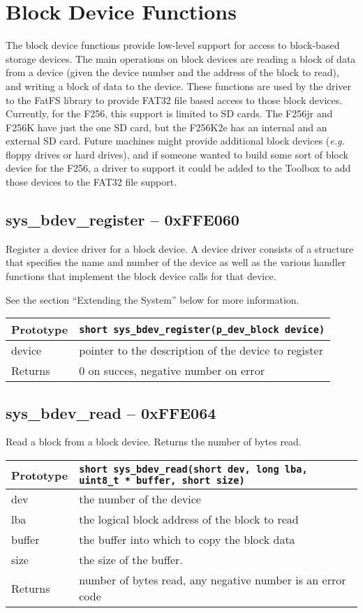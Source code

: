 \section{Block Device Functions}
The block device functions provide low-level support for access to block-based storage devices.
The main operations on block devices are reading a block of data from a device (given the device number and the
address of the block to read), and writing a block of data to the device.
These functions are used by the driver to the FatFS library to provide FAT32 file based access to those
block devices.
Currently, for the F256, this support is limited to SD cards. The F256jr and F256K have just the one SD card,
but the F256K2e has an internal and an external SD card.
Future machines might provide additional block devices ({\it e.g.} floppy drives or hard drives), and if someone
wanted to build some sort of block device for the F256, a driver to support it could be added to the Toolbox to
add those devices to the FAT32 file support.

\subsection*{sys\_bdev\_register -- 0xFFE060}
Register a device driver for a block device. A device driver consists of a structure that specifies the name and number of the device as well as the various handler functions that implement the block device calls for that device.

See the section ``Extending the System'' below for more information.

\bigskip

\begin{tabular}{|l||l|} \hline
Prototype & \lstinline!short sys_bdev_register(p_dev_block device)! \\ \hline
device & pointer to the description of the device to register \\ \hline
Returns & 0 on succes, negative number on error \\ \hline
\end{tabular}

\subsection*{sys\_bdev\_read -- 0xFFE064}
Read a block from a block device. Returns the number of bytes read.

\bigskip

\begin{tabular}{|l||l|} \hline
Prototype & \lstinline!short sys_bdev_read(short dev, long lba, uint8_t * buffer, short size)! \\ \hline
dev & the number of the device \\ \hline
lba & the logical block address of the block to read \\ \hline
buffer & the buffer into which to copy the block data \\ \hline
size & the size of the buffer. \\ \hline
Returns & number of bytes read, any negative number is an error code \\ \hline
\end{tabular}

